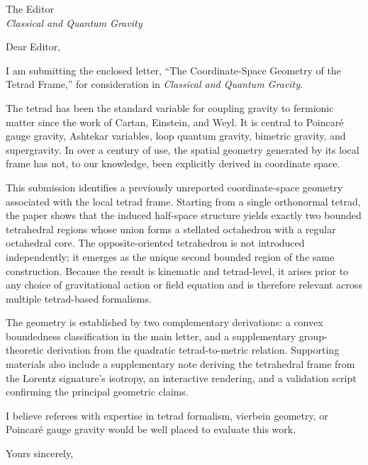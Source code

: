 \documentclass[11pt]{letter}
\begin{document}
\begin{letter}{%
The Editor\\
\textit{Classical and Quantum Gravity}%
}

\opening{Dear Editor,}

I am submitting the enclosed letter, ``The Coordinate-Space Geometry of the Tetrad Frame,'' for consideration in \textit{Classical and Quantum Gravity}.

The tetrad has been the standard variable for coupling gravity to fermionic matter since the work of Cartan, Einstein, and Weyl. It is central to Poincar\'{e} gauge gravity, Ashtekar variables, loop quantum gravity, bimetric gravity, and supergravity. In over a century of use, the spatial geometry generated by its local frame has not, to our knowledge, been explicitly derived in coordinate space.

This submission identifies a previously unreported coordinate-space geometry associated with the local tetrad frame. Starting from a single orthonormal tetrad, the paper shows that the induced half-space structure yields exactly two bounded tetrahedral regions whose union forms a stellated octahedron with a regular octahedral core. The opposite-oriented tetrahedron is not introduced independently; it emerges as the unique second bounded region of the same construction. Because the result is kinematic and tetrad-level, it arises prior to any choice of gravitational action or field equation and is therefore relevant across multiple tetrad-based formalisms.

The geometry is established by two complementary derivations: a convex boundedness classification in the main letter, and a supplementary group-theoretic derivation from the quadratic tetrad-to-metric relation. Supporting materials also include a supplementary note deriving the tetrahedral frame from the Lorentz signature's isotropy, an interactive rendering, and a validation script confirming the principal geometric claims.

I believe referees with expertise in tetrad formalism, vierbein geometry, or Poincar\'{e} gauge gravity would be well placed to evaluate this work.

\closing{Yours sincerely,}

\end{letter}
\end{document}
